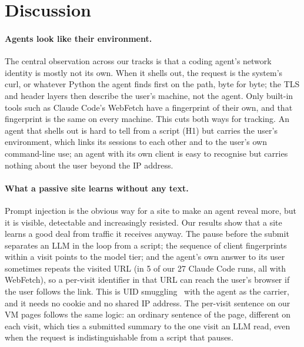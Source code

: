 
\section{Discussion}
\label{sec:discussion}

\paragraph{Agents look like their environment.} The central observation across our tracks is that a
coding agent's network identity is mostly not its own. When it shells out, the request is the system's
curl, or whatever Python the agent finds first on the path, byte for byte; the TLS and header layers
then describe the user's machine, not the agent. Only built-in tools such as Claude Code's WebFetch have
a fingerprint of their own, and that fingerprint is the same on every machine. This cuts both ways for
tracking. An agent that shells out is hard to tell from a script (H1) but carries the user's
environment, which links its sessions to each other and to the user's own command-line use; an agent
with its own client is easy to recognise but carries nothing about the user beyond the IP address.

\paragraph{What a passive site learns without any text.} Prompt injection is the obvious way for a site
to make an agent reveal more, but it is visible, detectable and increasingly resisted. Our results show
that a site learns a good deal from traffic it receives anyway. The pause before the submit separates an
LLM in the loop from a script; the sequence of client fingerprints within a visit points to the model
tier; and the agent's own answer to its user sometimes repeats the visited URL (in 5 of our 27 Claude
Code runs, all with WebFetch), so a per-visit identifier in that URL can reach the user's browser if
the user follows the link. This is UID smuggling~\cite{randall2022uid} with the agent as the carrier,
and it needs no cookie and no shared IP address. The per-visit sentence on our VM pages follows the
same logic: an ordinary sentence of the page, different on each visit, which ties a submitted summary
to the one visit an LLM read, even when the request is indistinguishable from a script that pauses.

